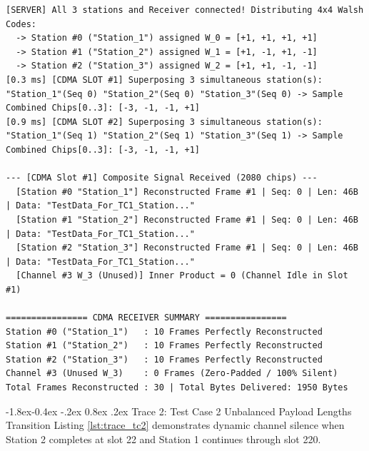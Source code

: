 \documentclass[11pt,a4paper]{article}
\makeatletter
\renewcommand\subsection{\@startsection{subsection}{2}{\z@}%
                                     {-1.8ex\@plus -0.4ex \@minus -.2ex}%
                                     {0.8ex \@plus .2ex}%
                                     {\normalfont\large\bfseries}}
\makeatother
\begin{document}
\begin{lstlisting}[style=tracestyle, caption={Live execution trace of Test Case 1: Non-power-of-2 matrix expansion and $W_3$ silence.}, label={lst:trace_tc1}]
[SERVER] All 3 stations and Receiver connected! Distributing 4x4 Walsh Codes:
  -> Station #0 ("Station_1") assigned W_0 = [+1, +1, +1, +1]
  -> Station #1 ("Station_2") assigned W_1 = [+1, -1, +1, -1]
  -> Station #2 ("Station_3") assigned W_2 = [+1, +1, -1, -1]
[0.3 ms] [CDMA SLOT #1] Superposing 3 simultaneous station(s): "Station_1"(Seq 0) "Station_2"(Seq 0) "Station_3"(Seq 0) -> Sample Combined Chips[0..3]: [-3, -1, -1, +1]
[0.9 ms] [CDMA SLOT #2] Superposing 3 simultaneous station(s): "Station_1"(Seq 1) "Station_2"(Seq 1) "Station_3"(Seq 1) -> Sample Combined Chips[0..3]: [-3, -1, -1, +1]

--- [CDMA Slot #1] Composite Signal Received (2080 chips) ---
  [Station #0 "Station_1"] Reconstructed Frame #1 | Seq: 0 | Len: 46B | Data: "TestData_For_TC1_Station..."
  [Station #1 "Station_2"] Reconstructed Frame #1 | Seq: 0 | Len: 46B | Data: "TestData_For_TC1_Station..."
  [Station #2 "Station_3"] Reconstructed Frame #1 | Seq: 0 | Len: 46B | Data: "TestData_For_TC1_Station..."
  [Channel #3 W_3 (Unused)] Inner Product = 0 (Channel Idle in Slot #1)

================ CDMA RECEIVER SUMMARY ================
Station #0 ("Station_1")   : 10 Frames Perfectly Reconstructed
Station #1 ("Station_2")   : 10 Frames Perfectly Reconstructed
Station #2 ("Station_3")   : 10 Frames Perfectly Reconstructed
Channel #3 (Unused W_3)    : 0 Frames (Zero-Padded / 100% Silent)
Total Frames Reconstructed : 30 | Total Bytes Delivered: 1950 Bytes
\end{lstlisting}

\subsection{Trace 2: Test Case 2 Unbalanced Payload Lengths Transition}
Listing \ref{lst:trace_tc2} demonstrates dynamic channel silence when Station 2 completes at slot 22 and Station 1 continues through slot 220.
\end{document}
